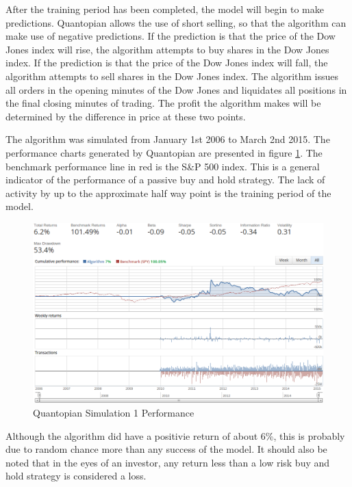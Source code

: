 \documentclass{report}
\begin{document}
After the training period has been completed, the model will begin to make predictions. Quantopian allows the use of short selling, so that the algorithm can make use of negative predictions. If the prediction is that the price of the Dow Jones index will rise, the algorithm attempts to buy shares in the Dow Jones index. If the prediction is that the price of the Dow Jones index will fall, the algorithm attempts to sell shares in the Dow Jones index. The algorithm issues all orders in the opening minutes of the Dow Jones and liquidates all positions in the final closing minutes of trading. The profit the algorithm makes will be determined by the difference in price at these two points.

The algorithm was simulated from January 1st 2006 to March 2nd 2015. The performance charts generated by Quantopian are presented in figure \ref{fig:quantopian-1}. The benchmark performance line in red is the S\&P 500 index. This is a general indicator of the performance of a passive buy and hold strategy. The lack of activity by up to the approximate half way point is the training period of the model.

\begin{figure}[H]
	\caption{Quantopian Simulation 1 Performance}
	\vspace{10pt}
	\centerline{\includegraphics[width=\textwidth]{vis/quantopian_related.png}}
	
	\label{fig:quantopian-1}
\end{figure}

Although the algorithm did have a positivie return of about 6\%, this is probably due to random chance more than any success of the model. It should also be noted that in the eyes of an investor, any return less than a low risk buy and hold strategy is considered a loss.
\end{document}

